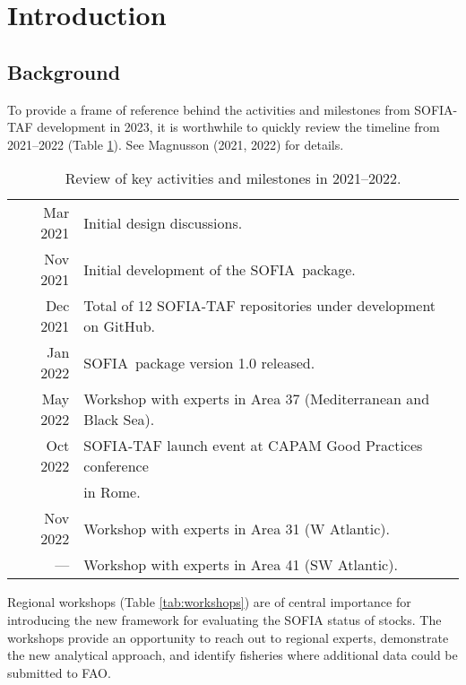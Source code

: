 \documentclass[12pt]{article}
\newcommand\I[1]{\rule{0pt}{#1}}
\newcommand\SOFIA{{\sf SOFIA}}
\begin{document}
\section{Introduction}

\subsection{Background}

To provide a frame of reference behind the activities and milestones from
SOFIA-TAF development in 2023, it is worthwhile to quickly review the timeline
from 2021--2022 (Table \ref{tab:timeline-history}). See Magnusson (2021, 2022)
for details.

\vspace{1ex}

\begin{table}[htb]\small
  \caption{Review of key activities and milestones in 2021--2022.}
  \centering
  \begin{tabular}{rl}
    \hline
    Mar 2021 & Initial design discussions.\I{2.3ex}\\[0.8ex]
    Nov 2021 & Initial development of the \SOFIA\ package.\\[0.8ex]
    Dec 2021 & Total of 12 SOFIA-TAF repositories under development on
               GitHub.\\[0.8ex]
    Jan 2022 & \SOFIA\ package version 1.0 released.\\[0.8ex]
    May 2022 & Workshop with experts in Area 37 (Mediterranean and Black
               Sea).\\[0.8ex]
    Oct 2022 & SOFIA-TAF launch event at CAPAM Good Practices conference\\
    ~        & in Rome.\\[0.8ex]
    Nov 2022 & Workshop with experts in Area 31 (W Atlantic).\\[0.8ex]
    ---      & Workshop with experts in Area 41 (SW Atlantic).\\
    \hline
  \end{tabular}
  \label{tab:timeline-history}
  \vspace{1ex}
\end{table}

\vspace{1ex}

Regional workshops (Table \ref{tab:workshops}) are of central importance for
introducing the new framework for evaluating the SOFIA status of stocks. The
workshops provide an opportunity to reach out to regional experts, demonstrate
the new analytical approach, and identify fisheries where additional data could
be submitted to FAO.
\end{document}
